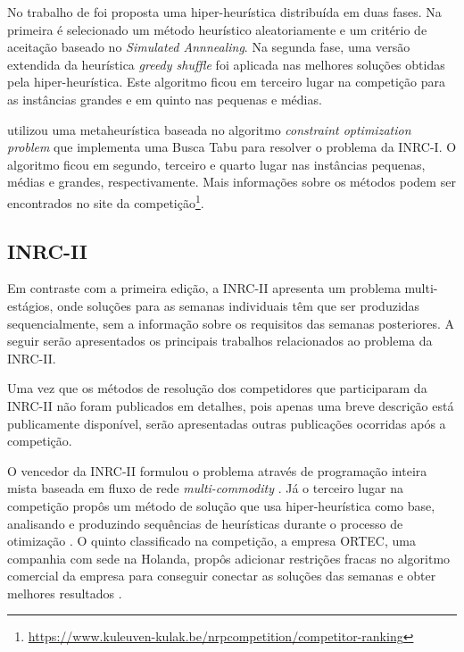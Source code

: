 \documentclass[cic,tc, twoside]{iiufrgs}
\begin{document}
No trabalho de \citet{bilgin2010hyper} foi proposta uma hiper-heurística distribuída em duas fases. 
Na primeira é selecionado um método heurístico aleatoriamente e um critério de aceitação baseado no \textit{Simulated Annnealing}.
Na segunda fase, uma versão extendida da heurística \textit{greedy shuffle} foi aplicada nas melhores soluções obtidas pela hiper-heurística.
Este algoritmo ficou em terceiro lugar na competição para as instâncias grandes e em quinto nas pequenas e médias.

\citet{nonobe2010inrc2010} utilizou uma metaheurística baseada no algoritmo \textit{constraint optimization problem} que implementa uma Busca Tabu para resolver o problema da INRC-I. O algoritmo ficou em segundo, terceiro e quarto lugar nas instâncias pequenas, médias e grandes, respectivamente. 
Mais informações sobre os métodos podem ser encontrados no site da competição\footnote{\url{https://www.kuleuven-kulak.be/nrpcompetition/competitor-ranking}}.

\subsection{INRC-II}

Em contraste com a primeira edição, a INRC-II apresenta um problema multi-estágios, onde soluções para as semanas individuais têm que ser produzidas sequencialmente, sem a informação sobre os requisitos das semanas posteriores.
A seguir serão apresentados os principais trabalhos relacionados ao problema da INRC-II. 

Uma vez que os métodos de resolução dos competidores que participaram da INRC-II não foram publicados em detalhes, pois apenas uma breve descrição está publicamente disponível, serão apresentadas outras publicações ocorridas após a competição.

O vencedor da INRC-II formulou o problema através de programação inteira mista baseada em fluxo de rede \textit{multi-commodity} \cite{romer2015multi}. 
Já o terceiro lugar na competição propôs um método de solução que usa hiper-heurística como base, analisando e produzindo sequências de heurísticas durante o processo de otimização \cite{kheirisequence}.
O quinto classificado na competição, a empresa ORTEC, uma companhia com sede na Holanda, propôs adicionar restrições fracas no algoritmo comercial da empresa para conseguir conectar as soluções das semanas e obter melhores resultados \cite{ortec}.
\end{document}
